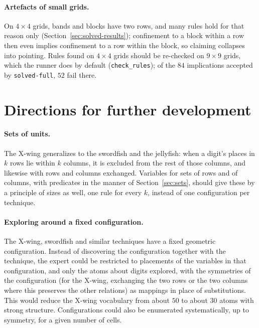 \documentclass[11pt,a4paper]{article}
\theoremstyle{definition}
\theoremstyle{remark}
\newcommand{\code}[1]{\texttt{#1}}
\begin{document}
\paragraph{Artefacts of small grids.}
On $4 \times 4$ grids, bands and blocks have two rows, and many rules hold for that reason only (Section~\ref{sec:solved-results}); confinement to a block within a row then even implies confinement to a row within the block, so claiming collapses into pointing. Rules found on $4 \times 4$ grids should be re-checked on $9 \times 9$ grids, which the runner does by default (\code{check\_rules}); of the $84$ implications accepted by \code{solved-full}, $52$ fail there.

\section{Directions for further development}\label{sec:future}

\paragraph{Sets of units.}
The X-wing generalizes to the swordfish and the jellyfish: when a digit's places in $k$ rows lie within $k$ columns, it is excluded from the rest of those columns, and likewise with rows and columns exchanged. Variables for sets of rows and of columns, with predicates in the manner of Section~\ref{sec:sets}, should give these by a principle of sizes as well, one rule for every $k$, instead of one configuration per technique.

\paragraph{Exploring around a fixed configuration.}
The X-wing, swordfish and similar techniques have a fixed geometric configuration. Instead of discovering the configuration together with the technique, the expert could be restricted to placements of the variables in that configuration, and only the atoms about digits explored, with the symmetries of the configuration (for the X-wing, exchanging the two rows or the two columns where this preserves the other relations) as mappings in place of substitutions. This would reduce the X-wing vocabulary from about $50$ to about $30$ atoms with strong structure. Configurations could also be enumerated systematically, up to symmetry, for a given number of cells.
\end{document}
